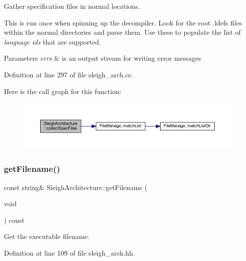 Gather specification files in normal locations. 

This is run once when spinning up the decompiler. Look for the root .ldefs files within the normal directories and parse them. Use these to populate the list of {\itshape language} {\itshape ids} that are supported. 
\begin{DoxyParams}{Parameters}
{\em errs} & is an output stream for writing error messages \\
\hline
\end{DoxyParams}


Definition at line 297 of file sleigh\+\_\+arch.\+cc.

Here is the call graph for this function\+:
\nopagebreak
\begin{figure}[H]
\begin{center}
\leavevmode
\includegraphics[width=350pt]{class_sleigh_architecture_ac037ef568059275e73b9be91f0612ef3_cgraph}
\end{center}
\end{figure}
\mbox{\label{class_sleigh_architecture_a67332981b2508f16d902ba1884329832}} 
\subsubsection{\texorpdfstring{getFilename()}{getFilename()}}
{\footnotesize\ttfamily const string\& Sleigh\+Architecture\+::get\+Filename (\begin{DoxyParamCaption}\item[{void}]{ }\end{DoxyParamCaption}) const\hspace{0.3cm}{\ttfamily [inline]}}



Get the executable filename. 



Definition at line 109 of file sleigh\+\_\+arch.\+hh.

\mbox{\label{class_sleigh_architecture_ac1f7860991c903a87cc9df4a8a6130c2}} 
